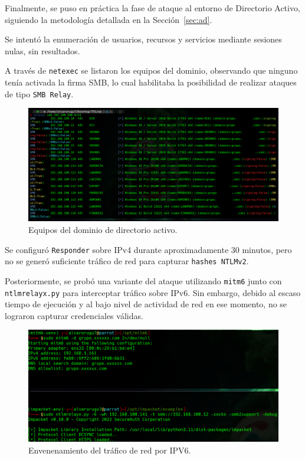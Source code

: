 \documentclass[a4paper, 11pt]{article}
\begin{document}
Finalmente, se puso en práctica la fase de ataque al entorno de Directorio Activo, siguiendo la metodología detallada en la Sección~\ref{sec:ad}.

Se intentó la enumeración de usuarios, recursos y servicios mediante sesiones nulas, sin resultados. 

A través de \texttt{netexec} se listaron los equipos del dominio, observando que ninguno tenía activada la firma SMB, lo cual habilitaba la posibilidad de realizar ataques de tipo \texttt{SMB Relay}.

\begin{figure}[H]
    \centering
    \includegraphics[width=1.1\textwidth]{images/smbsignature.png}
    \caption{Equipos del dominio de directorio activo.}
    \label{fig:smb_signature}
\end{figure}

Se configuró \texttt{Responder} sobre IPv4 durante aproximadamente 30 minutos, pero no se generó suficiente tráfico de red para capturar \texttt{hashes NTLMv2}.

Posteriormente, se probó una variante del ataque utilizando \texttt{mitm6} junto con \texttt{ntlmrelayx.py} para interceptar tráfico sobre IPv6. Sin embargo, debido al escaso tiempo de ejecución y al bajo nivel de actividad de red en ese momento, no se lograron capturar credenciales válidas.

\begin{figure}[H]
    \centering
    \includegraphics[width=1.1\textwidth]{images/ipv6_ad.png}
    \caption{Envenenamiento del tráfico de red por IPV6.}
    \label{fig:ipv6_poisoning}
\end{figure}
\end{document}
